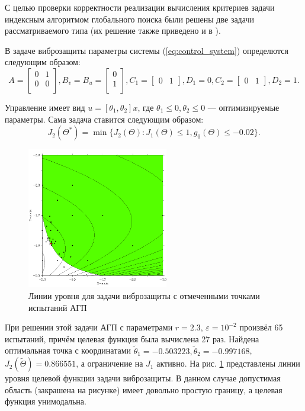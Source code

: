 С целью проверки корректности реализации вычисления критериев задачи
индексным алгоритмом глобального поиска были решены две задачи рассматриваемого типа
(их решение также приведено и в \cite{optControl}).

В задаче виброзащиты параметры системы (\ref{eq:control_system}) определются следующим
образом:
$$
A=\begin{bmatrix}
    0       & 1 \\
    0       & 0 \\
\end{bmatrix},
B_v=B_u=\begin{bmatrix}
  0       \\
  1       \\
\end{bmatrix},
C_1=\begin{bmatrix}
  0     & 1
\end{bmatrix},D_1=0,
C_2=\begin{bmatrix}
  0     & 1
\end{bmatrix},D_2=1.
$$

Управление имеет вид \(u=[\theta_1,\theta_2]x\), где \(\theta_1 \leqslant 0,\theta_2\leqslant 0\) ---
оптимизируемые параметры. Сама задача ставится следующим образом:
\begin{equation}
  \label{eq:opt_ctrl_problem}
  J_2(\Theta^*)=\min\{J_2(\Theta):J_1(\Theta)\leqslant 1, g_0(\Theta)\leqslant -0.02\}.
\end{equation}

\begin{figure}[ht]
  \center
  \includegraphics[width=0.55\textwidth]{images/controlProblem.png}
  \caption{Линии уровня для задачи виброзащиты с отмеченными точками испытаний АГП}
  \label{fig:controlProblem}
\end{figure}
При решении этой задачи АГП с параметрами \(r=2.3\), \(\varepsilon=10^{-2}\) произвёл
65 испытаний, причём целевая функция была вычислена 27 раз. Найдена оптимальная точка с координатами
\(\widetilde\theta_1 =-0.503223,\widetilde\theta_2=-0.997168\), \(J_2(\widetilde\Theta)=0.866551\),
а ограничение на \(J_1\) активно.
На рис. \ref{fig:controlProblem}
представлены линии уровня целевой функции задачи виброзащиты. В данном случае допустимая область (закрашена на рисунке)
имеет довольно простую границу, а целевая функция унимодальна.


